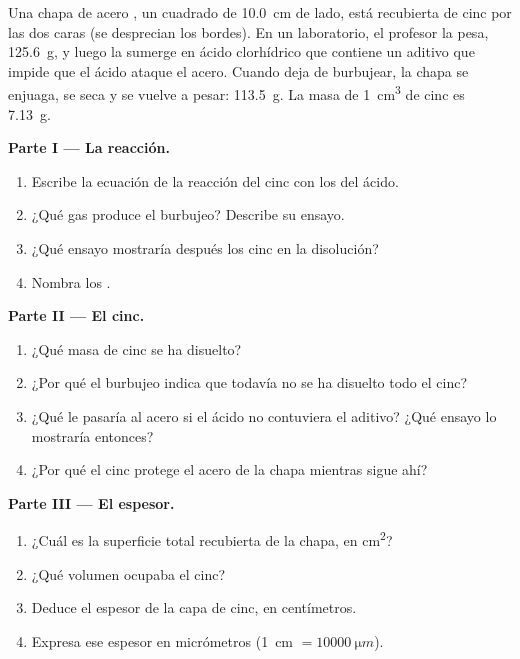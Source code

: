 \begin{problem}
\label{pb:g9:metals-acids-corrosion:1}
Una chapa de acero , un cuadrado de \qty{10.0}{cm} de lado,
está recubierta de cinc por las dos caras (se desprecian los bordes). En
un laboratorio, el profesor la pesa, \qty{125.6}{g}, y luego la sumerge
en ácido clorhídrico que contiene un aditivo que impide que el ácido
ataque el acero. Cuando deja de burbujear, la chapa se enjuaga, se seca
y se vuelve a pesar: \qty{113.5}{g}. La masa de \qty{1}{cm^3} de cinc es
\qty{7.13}{g}.

\medskip
\noindent\textbf{Parte I --- La reacción.}
\begin{enumerate}
  \item Escribe la ecuación de la reacción del cinc con los 
         del ácido.
  \item ¿Qué gas produce el burbujeo? Describe su ensayo.
  \item ¿Qué ensayo mostraría después los  cinc en la disolución?
  \item Nombra los .
\end{enumerate}

\medskip
\noindent\textbf{Parte II --- El cinc.}
\begin{enumerate}[resume]
  \item ¿Qué masa de cinc se ha disuelto?
  \item ¿Por qué el burbujeo indica que todavía no se ha disuelto todo
        el cinc?
  \item ¿Qué le pasaría al acero si el ácido no contuviera el aditivo?
        ¿Qué ensayo lo mostraría entonces?
  \item ¿Por qué el cinc protege el acero de la chapa mientras sigue
        ahí?
\end{enumerate}

\medskip
\noindent\textbf{Parte III --- El espesor.}
\begin{enumerate}[resume]
  \item ¿Cuál es la superficie total recubierta de la chapa, en
        \unit{cm^2}?
  \item ¿Qué volumen ocupaba el cinc?
  \item Deduce el espesor de la capa de cinc, en centímetros.
  \item Expresa ese espesor en micrómetros
        (\qty{1}{cm} $= \qty{10000}{\micro m}$).
\end{enumerate}
\end{problem}

